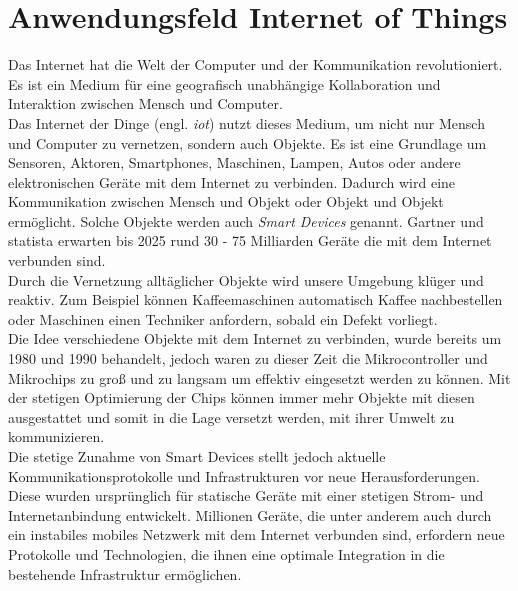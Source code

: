 \section{Anwendungsfeld Internet of Things} \label{s:domain}
Das Internet hat die Welt der Computer und der Kommunikation revolutioniert. Es ist ein Medium für eine geografisch unabhängige Kollaboration und Interaktion zwischen Mensch und Computer.
\cite{BriefHistoryInternet}
\\
Das Internet der Dinge (engl. \textit{\ac{iot}}) nutzt dieses Medium, um nicht nur Mensch und Computer zu vernetzen, sondern auch Objekte. Es ist eine Grundlage um Sensoren, Aktoren, Smartphones, Maschinen, Lampen, Autos oder andere elektronischen Geräte mit dem Internet zu verbinden.
\cite{morganSimpleExplanationInternet}
Dadurch wird eine Kommunikation zwischen Mensch und Objekt oder Objekt und Objekt ermöglicht.
\cite{uckelmannArchitectingInternetThings2011}
Solche Objekte werden auch \textit{Smart Devices} genannt.
Gartner \cite{hungGartnerInsightsHow} und statista \cite{GlobalIoTNonIoT} erwarten bis 2025 rund 30 - 75 Milliarden Geräte die mit dem Internet verbunden sind.
\\
Durch die Vernetzung alltäglicher Objekte wird unsere Umgebung klüger und reaktiv. Zum Beispiel können Kaffeemaschinen automatisch Kaffee nachbestellen oder Maschinen einen Techniker anfordern, sobald ein Defekt vorliegt.
\cite{rangerWhatIoTEverything}
\\
Die Idee verschiedene Objekte mit dem Internet zu verbinden, wurde bereits um 1980 und 1990 behandelt, jedoch waren zu dieser Zeit die Mikrocontroller und Mikrochips zu gro{\ss} und zu langsam um effektiv eingesetzt werden zu können.
Mit der stetigen Optimierung der Chips können immer mehr Objekte mit diesen ausgestattet und somit in die Lage versetzt werden, mit ihrer Umwelt zu kommunizieren.
\cite{rangerWhatIoTEverything}
\\
Die stetige Zunahme von Smart Devices stellt jedoch aktuelle Kommunikationsprotokolle und Infrastrukturen vor neue Herausforderungen.
Diese wurden ursprünglich für statische Geräte mit einer stetigen Strom- und Internetanbindung entwickelt. Millionen Geräte, die unter anderem auch durch ein instabiles mobiles Netzwerk mit dem Internet verbunden sind, erfordern neue Protokolle und Technologien, die ihnen eine optimale Integration in die bestehende Infrastruktur ermöglichen.
\cite{uckelmannArchitectingInternetThings2011}
\newpage

\begin{comment}
- Describe the (business) domain of your work. Ask yourself: What does the common reader need to know about the domain in order to understand the results of your work? For example, if you work contributes to the claim handling process of some insurance company, describe the common claim handling process.
- Please refrain from meandering explanations about details that have no relevance for later chapters (just in order to increase your page count).
- The header "Domain / Anwendungsfeld" is supposed to be replaced or extended with some more specific header like: "Domain 'Claim handling'"
\end{comment}
